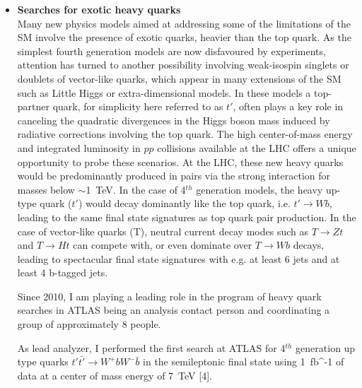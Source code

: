 \documentclass[12pt]{article}
\begin{document}
\begin{itemize}[leftmargin=1.3cm]
\item[] {\bf Searches for exotic heavy quarks}\\
Many new physics models aimed at addressing some of the limitations of the SM involve the presence of exotic quarks, heavier than the top quark. 
As the simplest fourth generation models are now disfavoured by experiments, 
attention has turned to another possibility involving weak-isospin singlets or doublets of vector-like quarks,
which appear in many extensions of the SM such as Little Higgs or extra-dimensional models. In these models a top-partner quark, 
for simplicity here referred to as $t'$, often plays a key role in canceling the quadratic divergences in the Higgs boson mass induced by radiative corrections 
involving the top quark. The high center-of-mass energy and integrated luminosity in $pp$ collisions available at the LHC offers a unique opportunity to probe 
these scenarios. At the LHC, these new heavy quarks would be predominantly produced in pairs via the strong interaction for masses below $\sim$1~TeV. 
In the case of 4$^{th}$ generation models, the heavy up-type quark ($t'$) would decay dominantly like the top quark, i.e. $t' \rightarrow Wb$, leading to the same 
final state signatures as top quark pair production. In the case of vector-like quarks (T), neutral current decay modes such as $T \rightarrow Zt$ and 
$T \rightarrow  Ht$ can compete with, or even dominate over $T \rightarrow Wb$ decays, leading to spectacular final state signatures with e.g. at 
least 6 jets and at least 4 b-tagged jets.
\vspace{2.5mm}

Since 2010, I am playing a leading role in the program of heavy quark searches in ATLAS being an analysis contact person and coordinating a group of 
approximately 8 people. 
\vspace{2.5mm}

As lead analyzer, I performed the first search at ATLAS for 4$^{th}$ generation up type quarks
$t'\bar{t'} \rightarrow W^{+}bW^{-}\bar{b}$ in the semileptonic final state using 1~fb^{-1} of data at
a center of mass energy of 7~TeV [4].
\vspace{2.5mm}


\end{itemize}
\end{document}
